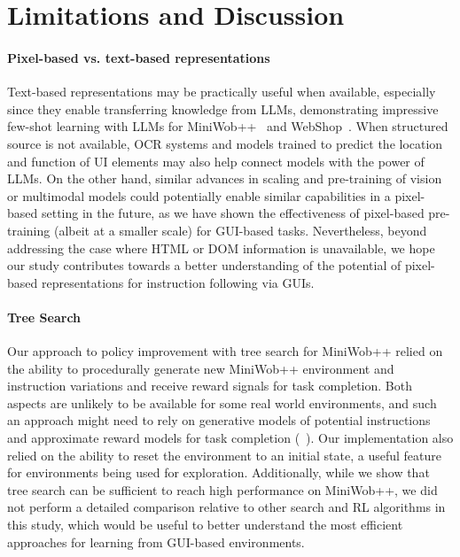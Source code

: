 \section{Limitations and Discussion}

\paragraph{Pixel-based vs. text-based representations} Text-based representations may be practically useful when available, especially since they enable transferring knowledge from LLMs, demonstrating impressive few-shot learning with LLMs for MiniWob++~\citep{kim2023language} and WebShop~\citep{yao2023react}. When structured source is not available, OCR systems and models trained to predict the location and function of UI elements may also help connect models with the power of LLMs. On the other hand, similar advances in scaling and pre-training of vision or multimodal models could potentially
enable similar capabilities in a pixel-based setting in the future, as we have shown the effectiveness of pixel-based pre-training (albeit at a smaller scale) for GUI-based tasks. Nevertheless, beyond addressing the case where HTML or DOM information is unavailable, we hope our study contributes towards a better understanding of the potential of pixel-based representations for instruction following via GUIs.

\paragraph{Tree Search} Our approach to policy improvement with tree search for MiniWob++ relied on the ability to procedurally generate new MiniWob++ environment and instruction variations and receive reward signals for task completion. Both aspects are unlikely to be available for some real world environments, and such an approach might need to rely on generative models of potential instructions and approximate reward models for task completion (\eg~\citet{bahdanau2018learning,du2023vision}). Our implementation also relied on the ability to reset the environment to an initial state, a useful feature for environments being used for exploration. Additionally, while we show that tree search can be sufficient to reach high performance on MiniWob++, we did not perform a detailed comparison relative to other search and RL algorithms in this study, which would be useful to better understand the most efficient approaches for learning from GUI-based environments.

